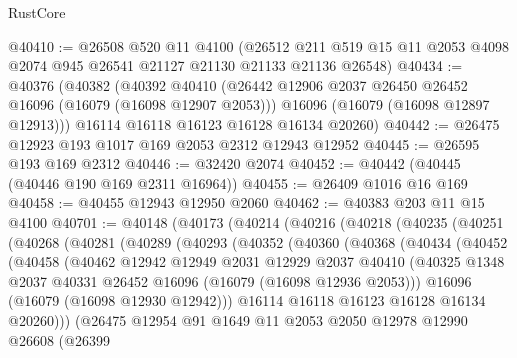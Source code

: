 \begin{lexlean}{RustCore}
\begin{coremodule}
@40410 := @26508
    @520
    @11
    @4100
    (@26512 @211 @519 @15 @11 @2053 @4098 @2074 @945 @26541 @21127 @21130 @21133 @21136 @26548)
@40434 := @40376
    (@40382
      (@40392
        @40410
        (@26442 @12906 @2037 @26450 @26452 @16096 (@16079 (@16098 @12907 @2053)))
        @16096
        (@16079 (@16098 @12897 @12913)))
      @16114
      @16118
      @16123
      @16128
      @16134
      @20260)
@40442 := @26475 @12923 @193 @1017 @169 @2053 @2312 @12943 @12952
@40445 := @26595 @193 @169 @2312
@40446 := @32420 @2074
@40452 := @40442 (@40445 (@40446 @190 @169 @2311 @16964))
@40455 := @26409 @1016 @16 @169
@40458 := @40455 @12943 @12950 @2060
@40462 := @40383 @203 @11 @15 @4100
@40701 := @40148
    (@40173
      (@40214
        (@40216
          (@40218
            (@40235
              (@40251
                (@40268
                  (@40281
                    (@40289
                      (@40293
                        (@40352
                          (@40360
                            (@40368
                              (@40434
                                (@40452
                                  (@40458
                                    (@40462
                                      @12942
                                      @12949
                                      @2031
                                      @12929
                                      @2037
                                      @40410
                                      (@40325
                                        @1348
                                        @2037
                                        @40331
                                        @26452
                                        @16096
                                        (@16079 (@16098 @12936 @2053)))
                                      @16096
                                      (@16079 (@16098 @12930 @12942)))
                                    @16114
                                    @16118
                                    @16123
                                    @16128
                                    @16134
                                    @20260)))
                              (@26475
                                @12954
                                @91
                                @1649
                                @11
                                @2053
                                @2050
                                @12978
                                @12990
                                @26608
                                (@26399

\end{coremodule}
\end{lexlean}
